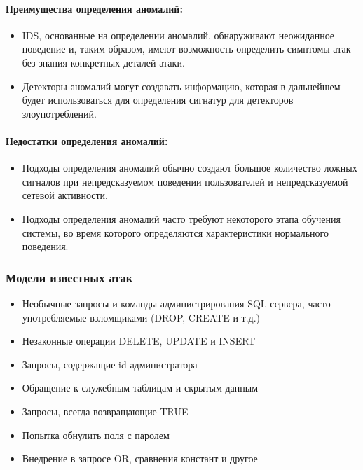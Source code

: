 \paragraph*{Преимущества определения аномалий:}

\begin{itemize}
	\item IDS, основанные на определении аномалий, обнаруживают неожиданное поведение и, таким образом, имеют возможность определить симптомы атак без знания конкретных деталей атаки.
	\item Детекторы аномалий могут создавать информацию, которая в дальнейшем будет использоваться для определения сигнатур для детекторов злоупотреблений.
\end{itemize}

\paragraph*{Недостатки определения аномалий:}

\begin{itemize}
	\item Подходы определения аномалий обычно создают большое количество ложных сигналов при непредсказуемом поведении пользователей и непредсказуемой сетевой активности.
	\item Подходы определения аномалий часто требуют некоторого этапа обучения системы, во время которого определяются характеристики нормального поведения.
\end{itemize}

\subsubsection{Модели известных атак}
\begin{itemize}
	\item Необычные запросы и команды администрирования SQL сервера, часто употребляемые 
	взломщиками (DROP, CREATE и т.д.)
	\item Незаконные операции DELETE, UPDATE и INSERT
	\item Запросы, содержащие id администратора
	\item Обращение к служебным таблицам и скрытым данным
	\item Запросы, всегда возвращающие TRUE
	\item Попытка обнулить поля с паролем
	\item Внедрение в запросе OR, сравнения констант и другое
\end{itemize}


